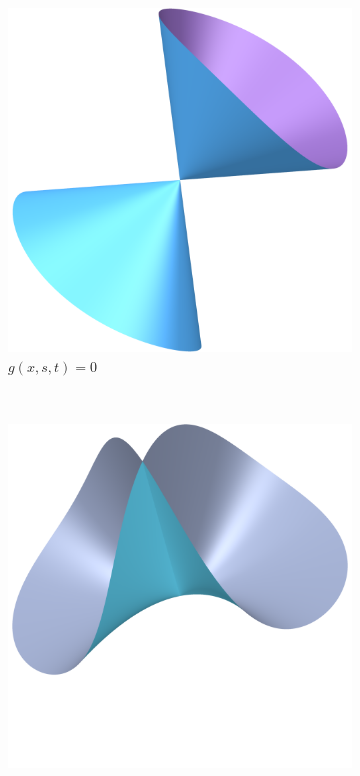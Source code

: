 \documentclass{article}
\begin{document}
\begin{example}
        \begin{figure}[h]
            \centering
            \begin{subfigure}[t]{0.3\textwidth}
                \includegraphics[width=\textwidth]{pictures/blowup_line_2.png}
                \caption{$g(x, s, t) = 0$}
            \end{subfigure}      
            ~
            \begin{subfigure}[t]{0.3\textwidth}
                \includegraphics[width=\textwidth]{pictures/blowup_line_1.png}

\end{subfigure}
\end{figure}
\end{example}
\end{document}
